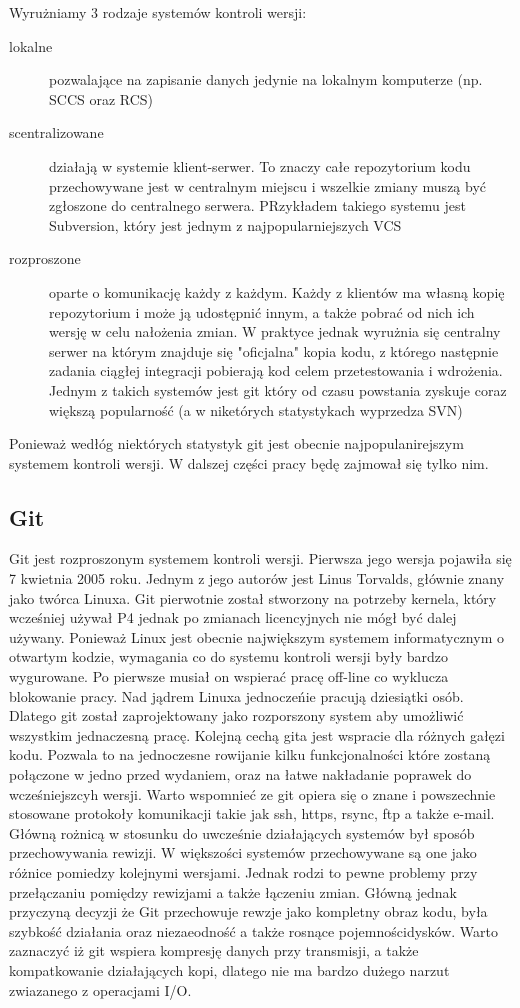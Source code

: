 \documentclass[a4paper,11pt,twoside]{report}
\theoremstyle{definition}
\begin{document}
Wyrużniamy 3 rodzaje systemów kontroli wersji:
\begin{description}
\item[lokalne] pozwalające na zapisanie danych jedynie na lokalnym komputerze 
(np. SCCS oraz RCS)
\item[scentralizowane] działają w systemie klient-serwer. To znaczy całe 
repozytorium kodu przechowywane jest w centralnym miejscu i wszelkie zmiany 
muszą być zgłoszone do centralnego serwera. PRzykładem takiego systemu jest 
Subversion, który jest jednym z najpopularniejszych VCS
\item[rozproszone] oparte o komunikację każdy z każdym. Każdy z klientów 
ma własną kopię repozytorium i może ją udostępnić innym, a także 
pobrać od nich ich wersję w celu nałożenia zmian. W praktyce jednak 
wyrużnia się centralny serwer na którym znajduje się "oficjalna" kopia 
kodu, z którego następnie zadania ciągłej integracji pobierają kod celem 
przetestowania i wdrożenia. Jednym z takich systemów jest git który od czasu 
powstania zyskuje coraz większą popularność (a w niketórych statystykach 
wyprzedza SVN)
\end{description}

Ponieważ wedłóg niektórych statystyk git jest obecnie najpopulanirejszym 
systemem kontroli wersji. W dalszej części pracy będę zajmował się tylko 
nim.


\subsection{Git}

Git jest rozproszonym systemem kontroli wersji. Pierwsza jego wersja pojawiła 
się 7 kwietnia 2005 roku. Jednym z jego autorów jest Linus Torvalds, 
głównie znany jako twórca Linuxa. Git pierwotnie został stworzony na 
potrzeby kernela, który wcześniej używał P4 jednak po zmianach licencyjnych 
nie mógł być dalej używany. Ponieważ Linux jest obecnie największym 
systemem informatycznym o otwartym kodzie, wymagania co do systemu kontroli 
wersji były bardzo wygurowane. Po pierwsze musiał on wspierać pracę 
off-line co wyklucza blokowanie pracy. Nad jądrem Linuxa jednoczeńie pracują 
dziesiątki osób. Dlatego git został zaprojektowany jako rozporszony system 
aby umożliwić wszystkim jednaczesną pracę. 
Kolejną cechą gita jest wspracie dla różnych gałęzi kodu. Pozwala to na 
jednoczesne rowijanie kilku funkcjonalności które zostaną połączone w 
jedno przed wydaniem, oraz na łatwe nakładanie poprawek do wcześniejszcyh 
wersji.
Warto wspomnieć ze git opiera się o znane i powszechnie stosowane protokoły 
komunikacji takie jak ssh, https, rsync, ftp a także e-mail.
Główną rożnicą w stosunku do uwcześnie działających systemów był 
sposób przechowywania rewizji. W większości systemów przechowywane są one 
jako różnice pomiedzy kolejnymi wersjami. Jednak rodzi to pewne problemy przy 
przełączaniu pomiędzy rewizjami a także łączeniu zmian. Główną jednak 
przyczyną decyzji że Git przechowuje rewzje jako kompletny obraz kodu, była 
szybkość działania oraz niezaeodność a także rosnące pojemnościdysków. 
Warto zaznaczyć iż git wspiera kompresję danych przy transmisji, a także 
kompatkowanie działających kopi, dlatego nie ma bardzo dużego narzut 
zwiazanego z operacjami I/O.
\end{document}
